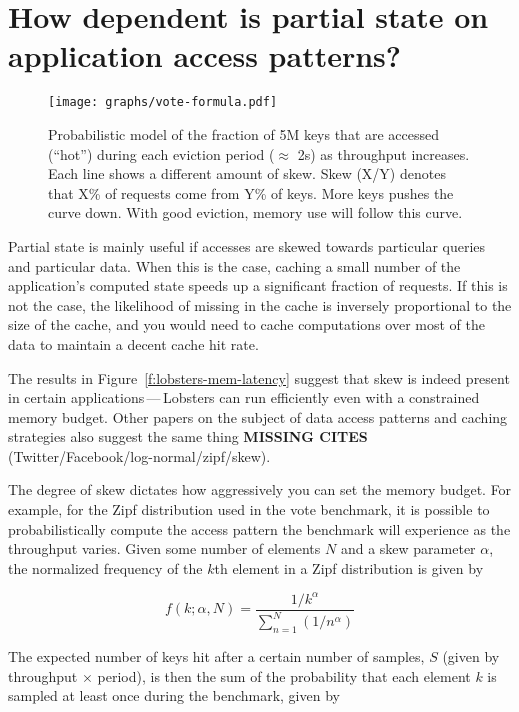 \section{How dependent is partial state on application access patterns?}
\label{s:eval:patterns}

\begin{figure}[h]
  \centering
  \texttt{[image: graphs/vote-formula.pdf]}
  \caption{Probabilistic model of the fraction of 5M keys that are accessed
  (``hot'') during each eviction period ($\approx$ 2s) as throughput increases.
  Each line shows a different amount of skew. Skew (X/Y) denotes that X\% of
  requests come from Y\% of keys. More keys pushes the curve down. With good
  eviction, memory use will follow this curve.}
  \label{f:vote-formula}
\end{figure}

Partial state is mainly useful if accesses are skewed towards particular queries
and particular data. When this is the case, caching a small number of the
application's computed state speeds up a significant fraction of requests. If
this is not the case, the likelihood of missing in the cache is inversely
proportional to the size of the cache, and you would need to cache computations
over most of the data to maintain a decent cache hit rate.

The results in Figure~\ref{f:lobsters-mem-latency} suggest that skew is indeed
present in certain applications\,---\,Lobsters can run efficiently even with a
constrained memory budget. Other papers on the subject of data access patterns
and caching strategies also suggest the same thing \textbf{MISSING CITES}
(Twitter/Facebook/log-normal/zipf/skew).

The degree of skew dictates how aggressively you can set the memory budget.
For example, for the Zipf distribution used in the vote benchmark, it is
possible to probabilistically compute the access pattern the benchmark will
experience as the throughput varies. Given some number of elements $N$ and a
skew parameter $\alpha$, the normalized frequency of the $k$th element in a Zipf
distribution is given by

\begin{displaymath}
  f(k;\alpha,N)={\frac {1/k^{\alpha}}{\sum \limits _{n=1}^{N}(1/n^{\alpha})}}
\end{displaymath}

The expected number of keys hit after a certain number of samples, $S$ (given by
throughput $\times$ period), is then the sum of the probability that each
element $k$ is sampled at least once during the benchmark, given by

